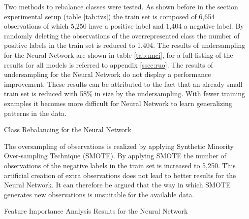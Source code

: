 Two methods to rebalance classes were tested. 
As shown before in the section experimental setup (table \ref{tab:tvs}) the train set is composed of 6,654 observations of which 5,250 have a positive label and 1,404 a negative label.
By randomly deleting the observations of the overrepresented class the number of positive labels in the train set is reduced to 1,404.
The results of undersampling for the Neural Network are shown in table \ref{tab:nnci}, for a full listing of the results for all models is referred to appendix \ref{ssec:ruo}.
The results of undersampling for the Neural Network do not display a performance improvement.
These  results can be attributed to the fact that an already small train set is reduced with 58\% in size by the undersampling.
With fewer training examples it becomes more difficult for Neural Network to learn generalizing patterns in the data.

\begin{table}[h]
\begin{footnotesize}

\end{footnotesize}
\caption{\footnotesize{\label{tab:nnci} Class Rebalancing for the Neural Network}}
\end{table}

The oversampling of observations is realized by applying Synthetic Minority Over-sampling Technique (SMOTE). 
By applying SMOTE the number of observations of the negative labels in the train set is increased to 5,250. 
This artificial creation of extra observations does not lead to better results for the Neural Network.
It can therefore be argued that the way in which SMOTE generates new observations is unsuitable for the available data.

\begin{table}[h]
\begin{footnotesize}

\end{footnotesize}
\caption{\label{tab:nnfi} \footnotesize{Feature Importance Analysis Results for the Neural Network}}
\end{table}

